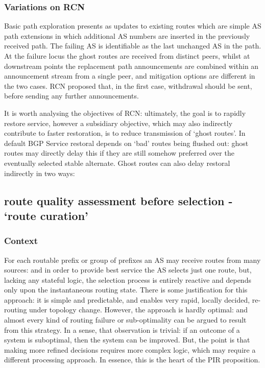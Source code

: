 
\subsubsection{Variations on RCN}

Basic path exploration presents as updates to existing routes which are simple AS path extensions in which additional AS numbers are inserted in the previously received path. The failing AS is identifiable as the last unchanged AS in the path. At the failure locus the ghost routes are received from distinct peers, whilst at downstream points the replacement path announcements are combined within an announcement stream from a single peer, and mitigation options are different in the two cases. RCN proposed that, in the first case, withdrawal should be sent, before sending any further announcements.

It is worth analysing the objectives of RCN: ultimately, the goal is to rapidly restore service, however a subsidiary objective, which may also indirectly contribute to faster restoration, is to reduce transmission of ‘ghost routes’. In default BGP Service restoral depends on ‘bad’ routes being flushed out: ghost routes may directly delay this if they are still somehow preferred over the eventually selected stable alternate. Ghost routes can also delay restoral indirectly in two ways:

\subsection{route quality assessment before selection - ‘route curation’}

\subsubsection{Context}

For each routable prefix or group of prefixes an AS may receive routes from many sources: and in order to provide best service the AS selects just one route, but, lacking any stateful logic, the selection process is entirely reactive and depends only upon the instantaneous routing state. There is some justification for this approach: it is simple and predictable, and enables very rapid, locally decided, re-routing under topology change. However, the approach is hardly optimal: and almost every kind of routing failure or sub-optimality can be argued to result from this strategy. In a sense, that observation is trivial: if an outcome of a system is suboptimal, then the system can be improved.
But, the point is that making more refined decisions requires more complex logic, which may require a different processing approach. In essence, this is the heart of the PIR proposition.

